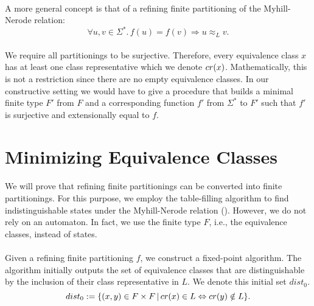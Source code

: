 \documentclass[11pt,a4paper,oneside]{book}
\begin{document}
                \paragraph{}

                    A more general concept is that of a refining finite partitioning of the Myhill-Nerode relation:
                    \[
                        \forall u, v \in \Sigma^*. \,
                        f(u) = f(v) \Rightarrow u \approx_L v.
                    \]




                \paragraph{}
                    We require all partitionings to be surjective.
                    Therefore, every equivalence class $x$ has at least one class representative which we denote $cr(x)$.
                    Mathematically, this is not a restriction since there are no empty equivalence classes.
                    In our constructive setting we would have to give a procedure that builds a minimal finite type $F'$ from $F$ and a corresponding function $f'$ from $\Sigma^*$ to $F'$ such that $f'$ is surjective and extensionally equal to $f$.

        \section{Minimizing Equivalence Classes}

            \paragraph{}
                We will prove that refining finite partitionings can be converted into finite partitionings. 
                For this purpose, we employ the table-filling algorithm to find indistinguishable states under the Myhill-Nerode relation (\cite{DBLP:books/daglib/0011126}).
                However, we do not rely on an automaton. 
                In fact, we use the finite type $F$, i.e., the equivalence classes, instead of states.

            \paragraph{}
                Given a refining finite partitioning $f$, we construct a fixed-point algorithm.
                The algorithm initially outputs the set of equivalence classes that are distinguishable by the inclusion of their class representative in $L$. 
                We denote this initial set $dist_0$.
                \[
                    dist_0 := \{ (x,y)  \in F \times F \, | \, cr(x) \in L \Leftrightarrow cr(y) \notin L\}.
                \]
                
\end{document}

